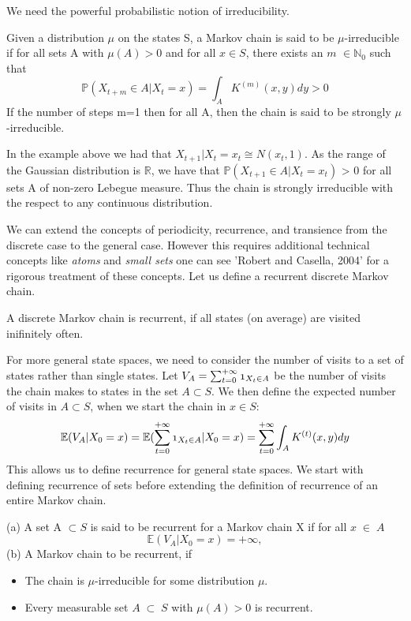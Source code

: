 \documentclass[a4paper,10pt]{article}
\newenvironment{definition}[1][Definition]{\begin{trivlist}
\item[\hskip \labelsep {\bfseries #1}]}{\end{trivlist}}
\newenvironment{example}[1][Example]{\begin{trivlist}
\item[\hskip \labelsep {\bfseries #1}]}{\end{trivlist}}
\newcommand{\qed}{\nobreak \ifvmode \relax \else
      \ifdim\lastskip<1.5em \hskip-\lastskip
      \hskip1.5em plus0em minus0.5em \fi \nobreak
      \vrule height0.75em width0.5em depth0.25em\fi}
\begin{document}
We need the powerful probabilistic notion of irreducibility.
\begin{definition}[Irreducibility]
 Given a distribution $\mu$ on the states S, a Markov chain is said to be $\mu$-irreducible if for all sets A
 with $\mu(A)> 0$  and for all $x \in S$, there exists an $m$ $\in \mathbb{N}_{0}$ such that
 \begin{equation*}
  \mathbb{P}(X_{t+m} \in A| X_t = x) = \int_A K^{(m)} (x,y) dy > 0
 \end{equation*}
If the number of steps m=1 then for all A, then the chain is said to be strongly $\mu$-irreducible.
\end{definition}
\begin{example}
 In the example above we had that $X_{t+1} | X_t = x_t \cong N(x_{t},1).$ As the range of the Gaussian distribution is
 $\mathbb{R}$, we have that $\mathbb{P}(X_{t+1} \in A | X_t =x_t)$ > 0 for all sets A of non-zero Lebegue measure.
 Thus the chain is strongly irreducible with the respect to any continuous distribution. \qed
\end{example}
 We can extend the concepts of periodicity, recurrence, and transience from the discrete case to the general case.
 However this requires additional technical concepts like \textit{atoms} and \textit{small sets} one can see 'Robert and 
 Casella, 2004' for a rigorous treatment of these concepts.
     Let us define a recurrent discrete Markov chain. 
     \begin{definition}
      A discrete Markov chain is recurrent, if all states (on average) are visited inifinitely often.
     \end{definition}
For more general state spaces, we need to consider the number of visits to a set of states rather than single 
states. Let $V_A = \sum^{+\infty}_{t=0}\mathbb{\oldstylenums{1}}_{{X_t \in A}}$ be the number of visits the chain makes to states in the
set $A \subset S$. We then define the expected number of visits in $A \subset S$, when we start the chain in $x \in S$:
\begin{equation*}
 \mathbb{E}(V_{A}|X_0 = x) = \mathbb{E}(\sum^{+\infty}_{t=0} \mathbb{\oldstylenums{1}}_{{X_t \in A}}|X_0 = x) = \sum_{t=0}^{+\infty}
 \int_A K^{(t)}(x,y)dy
\end{equation*}
This allows us to define recurrence for general state spaces. We start with defining recurrence of sets before extending
the definition of recurrence of an entire Markov chain.
\begin{definition}
 (a) A set A $\subset S$ is said to be recurrent for a Markov chain X if for all $x\;\in\; A$
 \begin{equation*}
  \mathbb{E}(V_A|X_0 = x) = +\infty,
 \end{equation*}
(b) A Markov chain to be recurrent, if 
\begin{itemize}
 \item The chain is $\mu$-irreducible for some distribution $\mu$.
 \item Every measurable set $A \;\subset\;S$ with $\mu(A) > 0$ is recurrent.
\end{itemize}

\end{definition}
\end{document}

